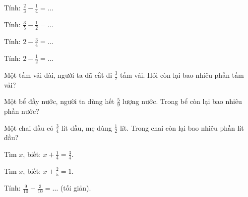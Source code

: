 \begin{ex}
Tính: $\frac{2}{3} - \frac{1}{4} = \dots$
\end{ex}

\begin{ex}
Tính: $\frac{3}{5} - \frac{1}{2} = \dots$
\end{ex}

\begin{ex}
Tính: $2 - \frac{3}{4} = \dots$
\end{ex}

\begin{ex}
Tính: $2 - \frac{1}{2} = \dots$
\end{ex}

\begin{ex}
Một tấm vải dài, người ta đã cắt đi $\frac{3}{7}$ tấm vải. Hỏi còn lại bao nhiêu phần tấm vải?
\end{ex}

\begin{ex}
Một bể đầy nước, người ta dùng hết $\frac{5}{9}$ lượng nước. Trong bể còn lại bao nhiêu phần nước?
\end{ex}

\begin{ex}
Một chai dầu có $\frac{3}{4}$ lít dầu, mẹ dùng $\frac{1}{2}$ lít. Trong chai còn lại bao nhiêu phần lít dầu?
\end{ex}

\begin{ex}
Tìm $x$, biết: $x + \frac{1}{4} = \frac{3}{4}$.
\end{ex}

\begin{ex}
Tìm $x$, biết: $x + \frac{2}{5} = 1$.
\end{ex}

\begin{ex}
Tính: $\frac{9}{10} - \frac{3}{10} = \dots$ (tối giản).
\end{ex}

